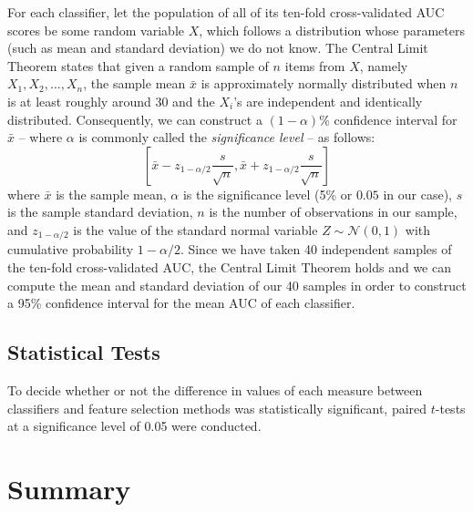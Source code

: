 For each classifier, let the population of all of its ten-fold cross-validated
AUC scores be some random variable $X$, which follows a distribution whose
parameters (such as mean and standard deviation) we do not know.
The Central Limit Theorem states that given a random
sample of $n$ items from $X$, namely $X_1,X_2,\dots,X_n$, the sample mean
$\bar{x}$
is approximately normally distributed when $n$ is at least roughly around 30
and the $X_i$'s are independent and identically distributed.
Consequently, we can construct a $(1-\alpha)$\% confidence interval for
$\bar{x}$ -- where $\alpha$ is commonly called the
\textit{significance level} -- as follows:
\begin{equation*}
  \left[\bar{x} - z_{1-\alpha/2}\dfrac{s}{\sqrt{n}},
    \bar{x} + z_{1-\alpha/2}\dfrac{s}{\sqrt{n}}\right]
\end{equation*}
where $\bar{x}$ is the sample mean, $\alpha$ is the significance level
(5\% or $0.05$ in our case), $s$ is the sample standard deviation, $n$
is the number of observations in our sample, and $z_{1-\alpha/2}$ is the value
of the standard normal variable $Z \sim \mathcal{N}(0,1)$ with cumulative
probability $1-\alpha/2$. Since we have taken 40 independent samples of the
ten-fold cross-validated AUC, the Central Limit Theorem holds and we can
compute the mean and standard deviation of our 40 samples in order to
construct a 95\% confidence interval for the mean AUC of each classifier.

\subsection{Statistical Tests}
To decide whether or not the difference in values of each measure between
classifiers and feature selection methods was statistically significant,
paired $t$-tests at a significance level of 0.05 were conducted.

\section{Summary}
